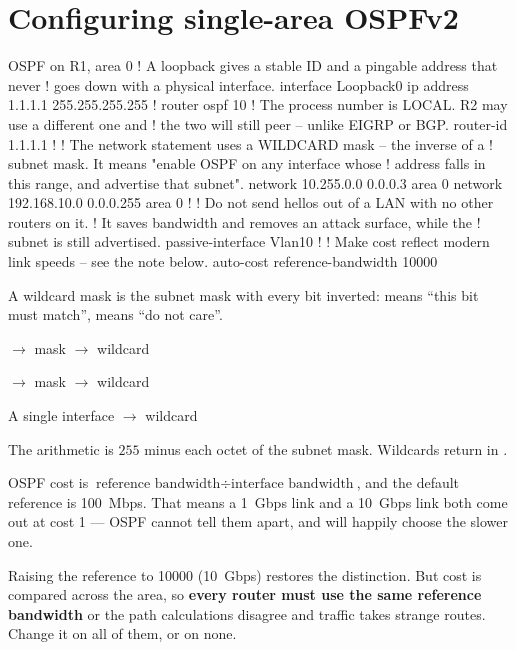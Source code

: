 \section{Configuring single-area OSPFv2}

\begin{config}{OSPF on R1, area 0}
! A loopback gives a stable ID and a pingable address that never
! goes down with a physical interface.
interface Loopback0
 ip address 1.1.1.1 255.255.255.255
!
router ospf 10
 ! The process number is LOCAL. R2 may use a different one and
 ! the two will still peer -- unlike EIGRP or BGP.
 router-id 1.1.1.1
 !
 ! The network statement uses a WILDCARD mask -- the inverse of a
 ! subnet mask. It means "enable OSPF on any interface whose
 ! address falls in this range, and advertise that subnet".
 network 10.255.0.0 0.0.0.3 area 0
 network 192.168.10.0 0.0.0.255 area 0
 !
 ! Do not send hellos out of a LAN with no other routers on it.
 ! It saves bandwidth and removes an attack surface, while the
 ! subnet is still advertised.
 passive-interface Vlan10
 !
 ! Make cost reflect modern link speeds -- see the note below.
 auto-cost reference-bandwidth 10000
\end{config}

\begin{conceptbox}
A wildcard mask is the subnet mask with every bit inverted:  means ``this
bit must match'',  means ``do not care''.

\begin{tight}
  \item {} $\rightarrow$ mask  $\rightarrow$ wildcard
  \item {} $\rightarrow$ mask  $\rightarrow$ wildcard
  \item A single interface $\rightarrow$ wildcard 
\end{tight}
The arithmetic is $255$ minus each octet of the subnet mask. Wildcards return in
.
\end{conceptbox}

\begin{alertbox}
OSPF cost is $\text{reference bandwidth} \div \text{interface bandwidth}$, and
the default reference is 100~Mbps. That means a 1~Gbps link and a 10~Gbps link
both come out at cost 1 --- OSPF cannot tell them apart, and will happily choose
the slower one.

Raising the reference to 10000 (10~Gbps) restores the distinction. But cost is
compared across the area, so \textbf{every router must use the same reference
bandwidth} or the path calculations disagree and traffic takes strange routes.
Change it on all of them, or on none.
\end{alertbox}

